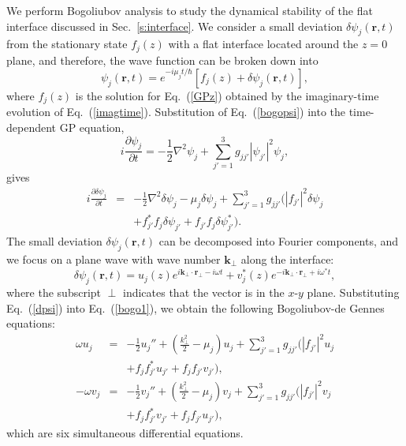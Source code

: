 \documentclass[pra,aps,superscriptaddress,twocolumn,color]{revtex4-1}
\begin{document}
We perform Bogoliubov analysis to study the dynamical stability of the
flat interface discussed in Sec.~\ref{s:interface}.
We consider a small deviation $\delta\psi_j(\bm{r}, t)$ from the
stationary state $f_j(z)$ with a flat interface located around the $z = 0$
plane, and therefore, the wave function can be broken down into
\begin{equation} \label{bogopsi}
\psi_j(\bm{r}, t) = e^{-i \mu_j t / \hbar} \left[ f_j(z) +
  \delta\psi_j(\bm{r}, t) \right],
\end{equation}
where $f_j(z)$ is the solution for Eq.~(\ref{GPz}) obtained by the
imaginary-time evolution of Eq.~(\ref{imagtime}).
Substitution of Eq.~(\ref{bogopsi}) into the time-dependent GP equation,
\begin{equation}
i \frac{\partial\psi_j}{\partial t} = 
-\frac{1}{2} \nabla^2 \psi_j + \sum_{j' = 1}^3 g_{jj'} |\psi_{j'}|^2 \psi_j,
\end{equation}
gives
\begin{eqnarray}
  i \frac{\partial\delta\psi_j}{\partial t} & = & -\frac{1}{2} \nabla^2
  \delta\psi_j - \mu_j \delta\psi_j + \sum_{j' = 1}^3 g_{jj'} \bigl(
  |f_{j'}|^2 \delta\psi_j 
\nonumber \\
& & + f_{j'}^* f_j \delta\psi_{j'} + f_{j'} f_j \delta\psi_{j'}^* \bigr).
\label{bogo1}
\end{eqnarray}
The small deviation $\delta\psi_j(\bm{r}, t)$ can be decomposed into
Fourier components, and we focus on a plane wave with wave number
$\bm{k}_\perp$ along the interface:
\begin{equation} \label{dpsi}
  \delta\psi_j(\bm{r}, t) =
  u_j(z) e^{i \bm{k}_\perp \cdot \bm{r}_\perp - i \omega t}
  + v_j^*(z) e^{-i \bm{k}_\perp \cdot \bm{r}_\perp + i \omega^* t},
\end{equation}
where the subscript $\perp$ indicates that the vector is in the $x$-$y$
plane.
Substituting Eq.~(\ref{dpsi}) into Eq.~(\ref{bogo1}), we obtain the
following Bogoliubov-de Gennes equations:
\begin{subequations} \label{BdG}
\begin{eqnarray}
  \omega u_j & = & -\frac{1}{2} u_j'' + \left( \frac{k_\perp^2}{2} - \mu_j
  \right) u_j + \sum_{j'=1}^3 g_{jj'} \bigl( |f_{j'}|^2 u_j \nonumber \\
  & & + f_j f_{j'}^* u_{j'} + f_j f_{j'} v_{j'} \bigr), \\
  -\omega v_j & = & -\frac{1}{2} v_j'' + \left( \frac{k_\perp^2}{2} - \mu_j
  \right) v_j + \sum_{j'=1}^3 g_{jj'} \bigl( |f_{j'}|^2 v_j \nonumber \\
  & & + f_j f_{j'}^* v_{j'} + f_j f_{j'} u_{j'} \bigr),
\end{eqnarray}
\end{subequations}
which are six simultaneous differential equations.
\end{document}
